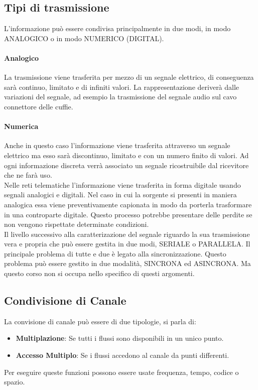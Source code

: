 \documentclass[12pt]{article}
\begin{document}
\subsection{Tipi di trasmissione}
L'informazione può essere condivisa principalmente in due modi, in modo ANALOGICO o in modo NUMERICO (DIGITAL).
\paragraph{Analogico}
La trasmissione viene trasferita per mezzo di un segnale elettrico, di conseguenza sarà continuo, limitato e di infiniti valori. La rappresentazione deriverà dalle variazioni del segnale, ad esempio la trasmissione del segnale audio sul cavo connettore delle cuffie.
\paragraph{Numerica}
Anche in questo caso l'informazione viene trasferita attraverso un segnale elettrico ma esso sarà discontinuo, limitato e con un numero finito di valori. Ad ogni informazione discreta verrà associato un segnale ricostruibile dal ricevitore che ne farà uso.\\
Nelle reti telematiche l'informazione viene trasferita in forma digitale usando segnali analogici e digitali. Nel caso in cui la sorgente si presenti in maniera analogica essa viene preventivamente capionata in modo da porterla trasformare in una controparte digitale. Questo processo potrebbe presentare delle perdite se non vengono rispettate determinate condizioni.\\
Il livello successivo alla caratterizazione del segnale riguardo la sua trasmissione vera e propria che può essere gestita in due modi, SERIALE o PARALLELA. Il principale problema di tutte e due è legato alla sincronizzazione. Questo problema può essere gestito in due modalità, SINCRONA ed ASINCRONA. Ma questo corso non si occupa nello specifico di questi argomenti.

\subsection{Condivisione di Canale}
La convisione di canale può essere di due tipologie, si parla di:
\begin{itemize}
  \item \textbf{Multiplazione}: Se tutti i flussi sono disponibili in un unico punto.
  \item \textbf{Accesso Multiplo}: Se i flussi accedono al canale da punti differenti.
\end{itemize}
Per eseguire queste funzioni possono essere usate frequenza, tempo, codice o spazio.
\end{document}
